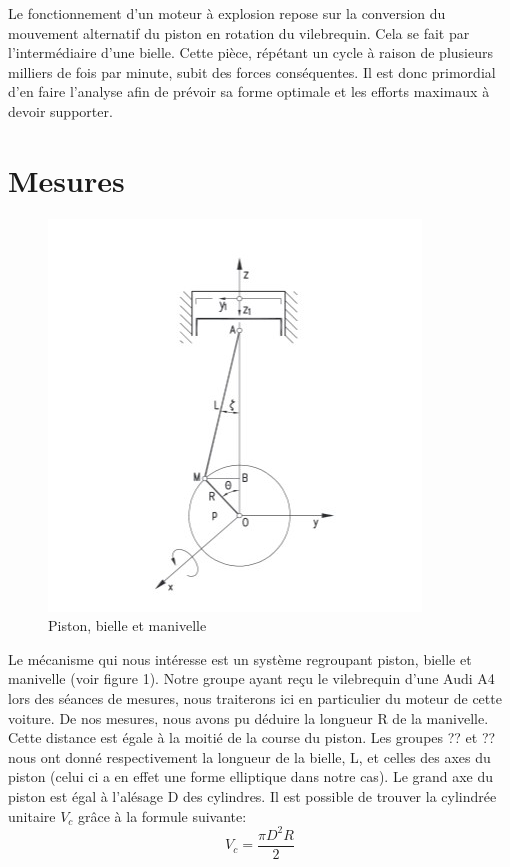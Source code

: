 \documentclass[a4paper,oneside,12pt]{report}
\begin{document}
Le fonctionnement d'un moteur à explosion repose sur la conversion du mouvement alternatif du piston en rotation du vilebrequin. Cela se fait par l'intermédiaire d'une bielle. Cette pièce, répétant un cycle à raison de plusieurs milliers de fois par minute, subit des forces conséquentes. Il est donc primordial d'en faire l'analyse afin de prévoir sa forme optimale et les efforts maximaux à devoir supporter. 

\section{Mesures}

\begin{figure}	
	\center
	\includegraphics[scale=0.8]{Dessin.jpg}
	\caption{Piston, bielle et manivelle}
\end{figure}

Le mécanisme qui nous intéresse est un système regroupant piston, bielle et manivelle (voir figure 1). Notre groupe ayant reçu le vilebrequin d'une Audi A4 lors des séances de mesures, nous traiterons ici en particulier du moteur de cette voiture. De nos mesures, nous avons pu déduire la longueur R de la manivelle. Cette distance est égale à la moitié de la course du piston. Les groupes ?? et ?? nous ont donné respectivement la longueur de la bielle, L, et celles des axes du piston (celui ci a en effet une forme elliptique dans notre cas). Le grand axe du piston est égal à l'alésage D des cylindres. Il est possible de trouver la cylindrée unitaire $V_c$ grâce à la formule suivante: 
$$V_c =\frac{\pi D^2 R}{2}$$
\end{document}
